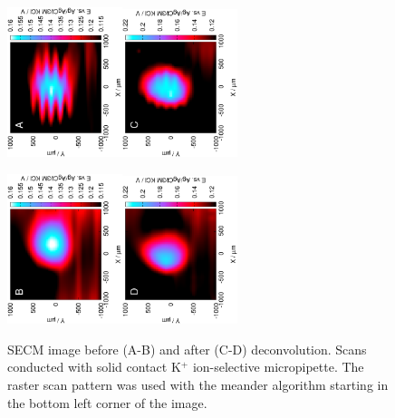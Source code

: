 \begin{figure}
\centering
\includegraphics[trim = 10mm 30mm 0mm 10mm, clip, width=0.3\textwidth, angle=-90]{img/K/14103106.eps}\includegraphics[trim = 10mm 30mm 0mm 10mm, clip, width=0.3\textwidth, angle=-90]{img/K/14103106_deconvoluted.eps}%

\includegraphics[trim = 10mm 30mm 0mm 10mm, clip, width=0.3\textwidth, angle=-90]{img/K/14103107.eps}\includegraphics[trim = 10mm 30mm 0mm 10mm, clip, width=0.3\textwidth, angle=-90]{img/K/14103107_deconvoluted.eps}

\caption[SECM image before and after deconvolution.
Scans conducted with solid contact K$^+$ ion-selective micropipette.]{SECM image before (A-B) and after (C-D) deconvolution.
Scans conducted with solid contact K$^+$ ion-selective micropipette.
The raster scan pattern was used with the meander algorithm starting in the bottom left corner of the image.}
\label{fig:deconvolution_potassium}
\end{figure}


